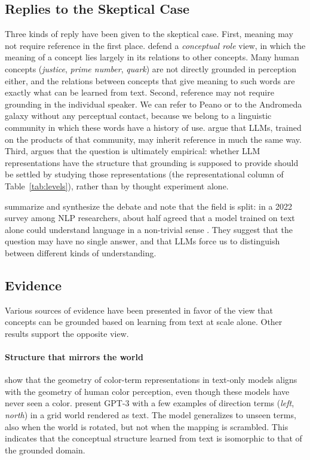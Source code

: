 \subsection{Replies to the Skeptical Case}
Three kinds of reply have been given to the skeptical case. First, meaning may not require reference in the first place. \citet{piantadosi2022meaning} defend a \emph{conceptual role} view, in which the meaning of a concept lies largely in its relations to other concepts. Many human concepts ({\em justice}, {\em prime number}, {\em quark}) are not directly grounded in perception either, and the relations between concepts that give meaning to such words are exactly what can be learned from text. Second, reference may not require grounding in the individual speaker. We can refer to Peano or to the Andromeda galaxy without any perceptual contact, because we belong to a linguistic community in which these words have a history of use. \citet{mandelkern2024language} argue that LLMs, trained on the products of that community, may inherit reference in much the same way. Third, \citet{pavlick2023symbols} argues that the question is ultimately empirical: whether LLM representations have the structure that grounding is supposed to provide should be settled by studying those representations (the representational column of Table~\ref{tab:levels}), rather than by thought experiment alone.

\citet{mitchell2023debate} summarize and synthesize the debate and note that the field is split: in a 2022 survey among NLP researchers, about half agreed that a model trained on text alone could understand language in a non-trivial sense \citep{michael2022what}. They suggest that the question may have no single answer, and that LLMs force us to distinguish between different kinds of understanding.

\subsection{Evidence}
Various sources of evidence have been presented in favor of the view that concepts can be grounded based on learning from text at scale alone. Other results support the opposite view.

\paragraph{Structure that mirrors the world}
\citet{abdou2021language} show that the geometry of color-term representations in text-only models aligns with the geometry of human color perception, even though these models have never seen a color. \citet{patel2022mapping} present GPT-3 with a few examples of direction terms ({\em left}, {\em north}) in a grid world rendered as text. The model generalizes to unseen terms, also when the world is rotated, but not when the mapping is scrambled. This indicates that the conceptual structure learned from text is isomorphic to that of the grounded domain.

